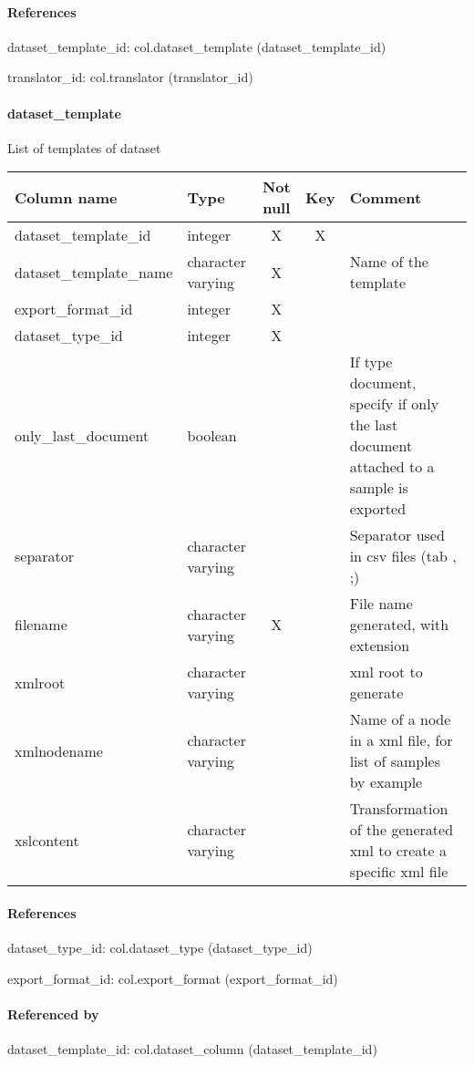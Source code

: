 \paragraph{References}
dataset\_template\_id: col.dataset\_template (dataset\_template\_id)

translator\_id: col.translator (translator\_id)

\paragraph{dataset\_template}
List of templates of dataset

\begin{tabular}{|l| p{2cm}|c|c| p{5cm}|}
\hline
Column name & Type & Not null & Key & Comment \\
\hline
dataset\_template\_id & integer & X & X & \\
dataset\_template\_name & character varying & X &  & Name of the template\\
export\_format\_id & integer & X &  & \\
dataset\_type\_id & integer & X &  & \\
only\_last\_document & boolean &  &  & If type document, specify if only the last document attached to a sample is exported\\
separator & character varying &  &  & Separator used in csv files (tab , ;)\\
filename & character varying & X &  & File name generated, with extension\\
xmlroot & character varying &  &  & xml root to generate\\
xmlnodename & character varying &  &  & Name of a node in a xml file, for list of samples by example\\
xslcontent & character varying &  &  & Transformation of the generated xml to create a specific xml file\\
\hline
\end{tabular}
\paragraph{References}
dataset\_type\_id: col.dataset\_type (dataset\_type\_id)

export\_format\_id: col.export\_format (export\_format\_id)

\paragraph{Referenced by}
dataset\_template\_id: col.dataset\_column (dataset\_template\_id)

